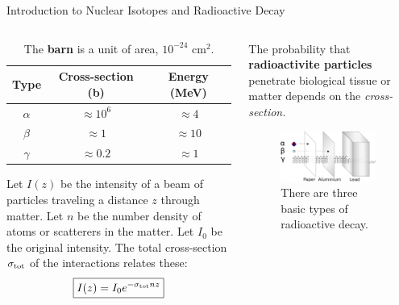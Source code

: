 \documentclass{beamer}
\begin{document}
\begin{frame}{Introduction to Nuclear Isotopes and Radioactive Decay}
\begin{columns}[T]
\begin{column}{0.6\textwidth}
\footnotesize
\begin{table}
\centering
\begin{tabular}{| c | c | c |}
\hline
Type & Cross-section (b) & Energy (MeV) \\ \hline
$\alpha$ & $\approx 10^6$ & $\approx 4$ \\ \hline
$\beta$ & $\approx 1$ & $\approx 10$ \\ \hline
$\gamma$ & $\approx 0.2$ & $\approx 1$ \\ \hline
\end{tabular}
\caption{\label{tab:radio2} The \textbf{barn} is a unit of area, $10^{-24}$ cm$^2$.}
\end{table}
Let $I(z)$ be the intensity of a beam of particles traveling a distance $z$ through matter.  Let $n$ be the number density of atoms or scatterers in the matter.  Let $I_0$ be the original intensity.  The total cross-section $\sigma_{\rm tot}$ of the interactions relates these:
\begin{equation}
\boxed{I(z) = I_0 e^{-\sigma_{\rm tot} n z}}
\end{equation}
\end{column}
\begin{column}{0.4\textwidth}
\footnotesize
The probability that \textbf{\alert{radioactivite particles}} penetrate biological tissue or matter depends on the \textit{cross-section.}
\begin{figure}
\centering
\includegraphics[width=0.95\textwidth]{figures/radioactivity.png}
\caption{\label{fig:radio3} There are three basic types of radioactive decay.}
\end{figure}
\end{column}
\end{columns}
\end{frame}
\end{document}
